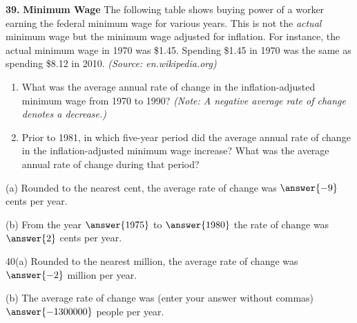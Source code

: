 \documentclass{ximera}
\begin{document}
\begin{problem}
\textbf{39.} \textbf{Minimum Wage} The following table shows buying power of a worker earning
  the federal minimum wage for various years. This is not the \emph{actual} minimum wage
  but the minimum wage adjusted for inflation. For instance, the actual minimum wage in
  1970 was \$1.45. Spending \$1.45 in 1970 was the same as spending \$8.12 in 2010.
  \emph{(Source: en.wikipedia.org)}
  \begin{enumerate}[label=\textbf{\alph*.},leftmargin=2em,topsep=2pt,itemsep=1pt]
    \item What was the average annual rate of change in the inflation-adjusted minimum
          wage from 1970 to 1990? \emph{(Note: A negative average rate of change denotes a
          decrease.)}
    \item Prior to 1981, in which five-year period did the average annual rate of change
          in the inflation-adjusted minimum wage increase? What was the average annual rate
          of change during that period?
  \end{enumerate}

(a) Rounded to the nearest cent, the average rate of change was $\answer{-9}$ cents per year.

(b) From the year $\answer{1975}$ to $\answer{1980}$ the rate of change was $\answer{2}$ cents per year.

40(a) Rounded to the nearest million, the average rate of change was $\answer{-2}$ million per year.

(b) The average rate of change was (enter your answer without commas) $\answer{-1300000}$ people per year.
\end{problem}
\end{document}
